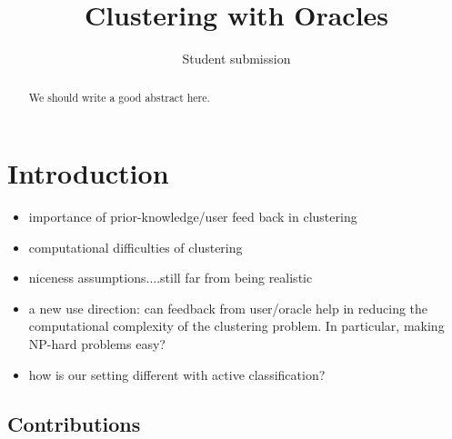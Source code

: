\documentclass[orivec]{llncs}
\title{Clustering with Oracles}
\author{Student submission}
\begin{document}
\maketitle

\begin{abstract}
We should write a good abstract here.
\end{abstract}

\section{Introduction}

\begin{itemize}
\item importance of prior-knowledge/user feed back in clustering
\item computational difficulties of clustering 
\item niceness assumptions....still far from being realistic
\item a new use direction: can feedback from user/oracle help in reducing the computational complexity of the clustering problem. In particular, making NP-hard problems easy?

\item how is our setting different with active classification?
\end{itemize}

\subsection{Contributions}
\end{document}
